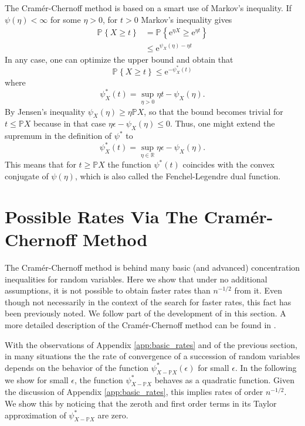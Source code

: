 \documentclass{uvamath}
\newcommand*{\reals}{\mathbb{R}}
\newcommand*{\bbP}{\mathbb{P}}
\newcommand*{\prob}[2][]{\mathbb{P}_{#1}\left\{#2\right\}}
\newcommand*{\rme}{\mathrm{e}}
\theoremstyle{remark}
\theoremstyle{definition}
\theoremstyle{definition}
\theoremstyle{definition}
\theoremstyle{definition}
\theoremstyle{definition}
\begin{document}
\begin{appendices}
The Cramér-Chernoff method is based on a smart use of Markov's
inequality. If $\psi(\eta)<\infty$ for some $\eta>0$, for $t>0$
Markov's inequality gives
\begin{align}
  \prob{X \geq t} &= \prob{ \rme^{\eta X} \geq
                           \rme^{\eta t} }\\
  &\leq \rme^{\psi_X(\eta) - \eta t}
\end{align}
In any case, one can optimize the upper bound and obtain that
\begin{equation*}
  \prob{ X \geq t } \leq \rme^{-\psi_X^*(t)}
\end{equation*}
where
\begin{equation*}
  \psi_X^*(t) = \sup_{\eta > 0}\eta t - \psi_X(\eta).
\end{equation*}
By Jensen's inequality $\psi_X(\eta) \geq \eta\bbP X$, so that the
bound becomes trivial for $t\leq \bbP X$ because in that case
$\eta\epsilon - \psi_X(\eta)\leq 0$. Thus, one might extend the
supremum in the definition of $\psi^{*}$ to
\begin{equation*}
  \psi_X^*(t) = \sup_{\eta \in \reals}\eta\epsilon - \psi_X(\eta).
\end{equation*}
This means that for $t\geq \bbP X$ the function $\psi^*(t)$ coincides
with the convex conjugate of $\psi(\eta)$, which is also called the
Fenchel-Legendre dual function.


\section{Possible Rates Via The Cramér-Chernoff Method}

The Cramér-Chernoff method is behind many basic (and advanced)
concentration inequalities for random variables. Here we show that
under no additional assumptions, it is not possible to obtain faster
rates than $n^{-1/2}$ from it. Even though not necessarily in the
context of the search for faster rates, this fact has been previously
noted. We follow part of the development of
\citet{mcallester_concentration_2003} in this section. A more detailed
description of the Cramér-Chernoff method can be found in
\citet[Chapter 2]{boucheron_concentration_2013}.

With the observations of Appendix \ref{app:basic_rates} and of the
previous section, in many situations the the rate of convergence of a
succession of random variables depends on the behavior of the function
$\psi_{X-\bbP X}^*(\epsilon)$ for small $\epsilon$. In the following
we show for small $\epsilon$, the function $\psi^*_{X-\bbP X}$ behaves
as a quadratic function. Given the discussion of Appendix
\ref{app:basic_rates}, this implies rates of order $n^{-1/2}$. We show
this by noticing that the zeroth and first order terms in its Taylor
approximation of $\psi^*_{X-\bbP X}$ are zero.


\end{appendices}
\end{document}
